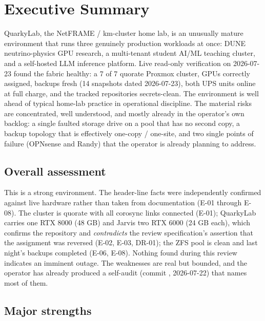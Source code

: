 \section{Executive Summary}\label{sec:exec}

\begin{callout}[title=One-paragraph verdict]
QuarkyLab, the NetFRAME / km-cluster home lab, is an unusually mature environment
that runs three genuinely production workloads at once: DUNE neutrino-physics GPU
research, a multi-tenant student AI/ML teaching cluster, and a self-hosted LLM
inference platform. Live read-only verification on 2026-07-23 found the fabric
healthy: a 7 of 7 quorate Proxmox cluster, GPUs correctly assigned, backups fresh
(14 snapshots dated 2026-07-23), both UPS units online at full charge, and the
tracked repositories secrets-clean. The environment is well ahead of typical
home-lab practice in operational discipline. The material risks are concentrated,
well understood, and mostly already in the operator's own backlog: a single
faulted storage drive on a pool that has no second copy, a backup topology that is
effectively one-copy / one-site, and two single points of failure (OPNsense and
Randy) that the operator is already planning to address.
\end{callout}

\subsection{Overall assessment}

This is a strong environment. The header-line facts were independently confirmed
against live hardware rather than taken from documentation (E-01 through E-08).
The cluster is quorate with all corosync links connected (E-01); QuarkyLab carries
one RTX 8000 (48 GB) and Jarvis two RTX 6000 (24 GB each), which confirms the
repository and \emph{contradicts} the review specification's assertion that the
assignment was reversed (E-02, E-03, DR-01); the ZFS  pool is
clean and last night's backups completed (E-06, E-08). Nothing found during this
review indicates an imminent outage. The weaknesses are real but bounded, and the
operator has already produced a self-audit (commit , 2026-07-22)
that names most of them.

\subsection{Major strengths}

